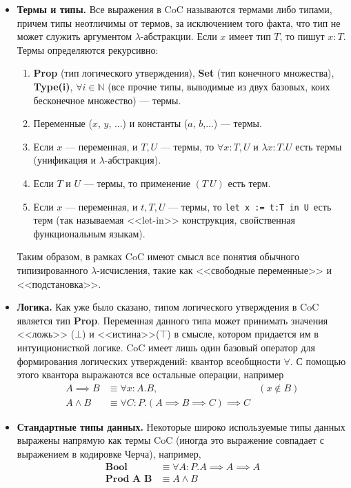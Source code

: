 \begin{itemize}
\item \textbf{Термы и типы.} Все выражения в CoC называются термами либо типами, причем типы неотличимы от термов, за исключением того факта, что тип не может служить аргументом $\lambda$-абстракции. Если $x$ имеет тип $T$, то пишут $x:T$. Термы определяются рекурсивно:
\begin{enumerate}
\item \textbf{Prop} (тип логического утверждения), \textbf{Set} (тип конечного множества), \textbf{Type(i)}, $\forall i \in \mathbb{N}$ (все прочие типы, выводимые из двух базовых, коих бесконечное множество) --- термы.
\item Переменные ($x$, $y$, ...) и константы ($a$, $b$,...) --- термы.
\item Если $x$ --- переменная, и $T, U$ --- термы, то $\forall x : T, U$ и $\lambda x : T. U$ есть термы (унификация и $\lambda$-абстракция).
\item Если $T$ и $U$ --- термы, то применение $(T\ U)$ есть терм.
\item Если $x$ --- переменная, и $t, T, U$ --- термы, то \texttt{let x := t:T in U}~есть терм (так называемая <<let-in>> конструкция, свойственная функциональным языкам).
\end{enumerate}
Таким образом, в рамках CoC имеют смысл все понятия обычного типизированного $\lambda$-исчисления, такие как <<свободные переменные>> и <<подстановка>>.

\item \textbf{Логика.} Как уже было сказано, типом логического утверждения в CoC является тип \textbf{Prop}. Переменная данного типа может принимать значения <<ложь>> ($\bot$) и <<истина>>($\top$) в смысле, котором придается им в интуиционисткой логике.
CoC имеет лишь один базовый оператор для формирования логических утверждений: квантор всеобщности $\forall$. С помощью этого квантора выражаются все остальные операции, например
\begin{align*}
A \implies B &\equiv \forall x: A.B, & (x \notin B) \\
A \wedge B &\equiv \forall C : P.(A \implies B \implies C) \implies C &
\end{align*}
\item \textbf{Стандартные типы данных.} Некоторые широко используемые типы данных выражены напрямую как термы CoC (иногда это выражение совпадает с выражением в кодировке Черча), например,
\begin{align*}
\textbf{Bool} & \equiv \forall A:P.A \implies A \implies A \\
\textbf{Prod A B} & \equiv A \wedge B
\end{align*}
\end{itemize}

